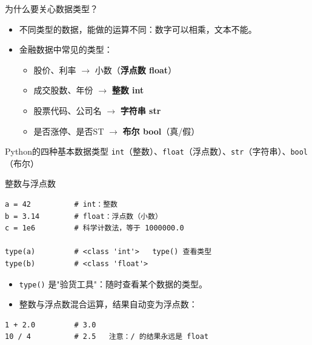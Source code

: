 \documentclass[9pt]{ctexbeamer}
\begin{document}
\begin{frame}{为什么要关心数据类型？}
	\begin{itemize}
		\item 不同类型的数据，能做的运算不同：数字可以相乘，文本不能。
		\item 金融数据中常见的类型：
		\begin{itemize}
			\item 股价、利率 $\rightarrow$ 小数（\textbf{浮点数 float}）
			\item 成交股数、年份 $\rightarrow$ \textbf{整数 int}
			\item 股票代码、公司名 $\rightarrow$ \textbf{字符串 str}
			\item 是否涨停、是否ST $\rightarrow$ \textbf{布尔 bool}（真/假）
		\end{itemize}
	\end{itemize}
	\begin{block}{Python的四种基本数据类型}
		\centering
		\texttt{int}（整数）、\texttt{float}（浮点数）、\texttt{str}（字符串）、\texttt{bool}（布尔）
	\end{block}
\end{frame}

\begin{frame}[fragile]{整数与浮点数}
	\begin{lstlisting}
a = 42          # int：整数
b = 3.14        # float：浮点数（小数）
c = 1e6         # 科学计数法，等于 1000000.0

type(a)         # <class 'int'>   type() 查看类型
type(b)         # <class 'float'>
\end{lstlisting}
	\begin{itemize}
		\item \texttt{type()} 是"验货工具"：随时查看某个数据的类型。
		\item 整数与浮点数混合运算，结果自动变为浮点数：
	\end{itemize}
	\begin{lstlisting}
1 + 2.0         # 3.0
10 / 4          # 2.5   注意：/ 的结果永远是 float
\end{lstlisting}
\end{frame}
\end{document}
